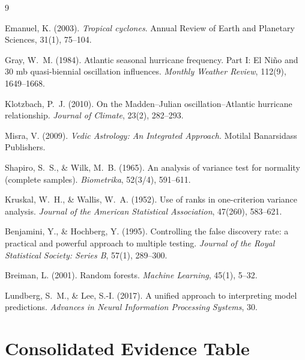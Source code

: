 \documentclass[12pt,a4paper]{article}
\begin{document}

\begin{thebibliography}{9}

Emanuel, K. (2003).
\textit{Tropical cyclones}.
Annual Review of Earth and Planetary Sciences, 31(1), 75--104.

Gray, W.~M. (1984).
Atlantic seasonal hurricane frequency. Part I: El Ni\~no and 30 mb
quasi-biennial oscillation influences.
\textit{Monthly Weather Review}, 112(9), 1649--1668.

Klotzbach, P.~J. (2010).
On the Madden--Julian oscillation--Atlantic hurricane relationship.
\textit{Journal of Climate}, 23(2), 282--293.

Misra, V. (2009).
\textit{Vedic Astrology: An Integrated Approach.}
Motilal Banarsidass Publishers.

Shapiro, S.~S., \& Wilk, M.~B. (1965).
An analysis of variance test for normality (complete samples).
\textit{Biometrika}, 52(3/4), 591--611.

Kruskal, W.~H., \& Wallis, W.~A. (1952).
Use of ranks in one-criterion variance analysis.
\textit{Journal of the American Statistical Association}, 47(260), 583--621.

Benjamini, Y., \& Hochberg, Y. (1995).
Controlling the false discovery rate: a practical and powerful approach to
multiple testing.
\textit{Journal of the Royal Statistical Society: Series B}, 57(1), 289--300.

Breiman, L. (2001).
Random forests.
\textit{Machine Learning}, 45(1), 5--32.

Lundberg, S.~M., \& Lee, S.-I. (2017).
A unified approach to interpreting model predictions.
\textit{Advances in Neural Information Processing Systems}, 30.

\end{thebibliography}

\appendix

\section{Consolidated Evidence Table}
\label{app:evidence}
\end{document}
